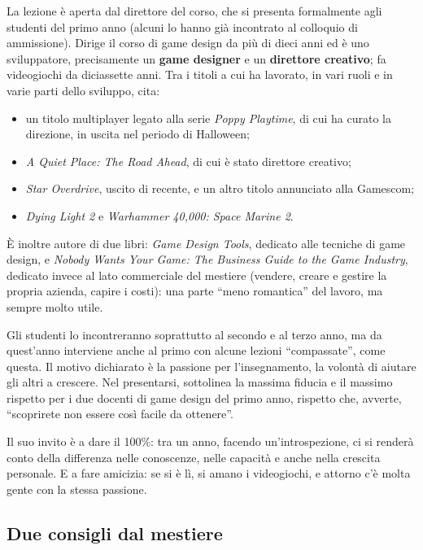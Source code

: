 La lezione è aperta dal direttore del corso, che si presenta formalmente agli
studenti del primo anno (alcuni lo hanno già incontrato al colloquio di
ammissione). Dirige il corso di game design da più di dieci anni ed è uno
sviluppatore, precisamente un \textbf{game designer} e un \textbf{direttore
creativo}; fa videogiochi da diciassette anni. Tra i titoli a cui ha lavorato,
in vari ruoli e in varie parti dello sviluppo, cita:
\begin{itemize}
  \item un titolo multiplayer legato alla serie \emph{Poppy Playtime}, di cui
        ha curato la direzione, in uscita nel periodo di Halloween;
  \item \emph{A Quiet Place: The Road Ahead}, di cui è stato direttore
        creativo;
  \item \emph{Star Overdrive}, uscito di recente, e un altro titolo annunciato
        alla Gamescom;
  \item \emph{Dying Light 2} e \emph{Warhammer 40,000: Space Marine 2}.
\end{itemize}
È inoltre autore di due libri: \emph{Game Design Tools}, dedicato alle
tecniche di game design, e \emph{Nobody Wants Your Game: The Business Guide to
the Game Industry}, dedicato invece al lato commerciale del mestiere (vendere,
creare e gestire la propria azienda, capire i costi): una parte ``meno
romantica'' del lavoro, ma sempre molto utile.

Gli studenti lo incontreranno soprattutto al secondo e al terzo anno, ma da
quest'anno interviene anche al primo con alcune lezioni ``compassate'', come
questa. Il motivo dichiarato è la passione per l'insegnamento, la volontà di
aiutare gli altri a crescere. Nel presentarsi, sottolinea la massima fiducia e
il massimo rispetto per i due docenti di game design del primo anno, rispetto
che, avverte, ``scoprirete non essere così facile da ottenere''.

Il suo invito è a dare il 100\%: tra un anno, facendo un'introspezione, ci si
renderà conto della differenza nelle conoscenze, nelle capacità e anche nella
crescita personale. E a fare amicizia: se si è lì, si amano i videogiochi, e
attorno c'è molta gente con la stessa passione.

\subsection{Due consigli dal mestiere}

